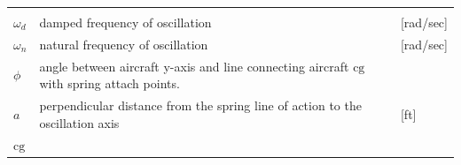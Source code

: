 \documentclass[
]{book}
\begin{document}
\begin{longtable}[]{@{}lll@{}}
\begin{minipage}[t]{0.68\columnwidth}
\end{minipage} & \begin{minipage}[t]{0.10\columnwidth}\raggedright
\strut
\end{minipage}\tabularnewline
\begin{minipage}[t]{0.14\columnwidth}\raggedright
\(\omega_d\)\strut
\end{minipage} & \begin{minipage}[t]{0.68\columnwidth}\raggedright
damped frequency of oscillation\strut
\end{minipage} & \begin{minipage}[t]{0.10\columnwidth}\raggedright
{[}rad/sec{]}\strut
\end{minipage}\tabularnewline
\begin{minipage}[t]{0.14\columnwidth}\raggedright
\(\omega_n\)\strut
\end{minipage} & \begin{minipage}[t]{0.68\columnwidth}\raggedright
natural frequency of oscillation\strut
\end{minipage} & \begin{minipage}[t]{0.10\columnwidth}\raggedright
{[}rad/sec{]}\strut
\end{minipage}\tabularnewline
\begin{minipage}[t]{0.14\columnwidth}\raggedright
\(\phi\)\strut
\end{minipage} & \begin{minipage}[t]{0.68\columnwidth}\raggedright
angle between aircraft y-axis and line connecting aircraft \(\mathrm{cg}\) with spring attach points.\strut
\end{minipage} & \begin{minipage}[t]{0.10\columnwidth}\raggedright
\strut
\end{minipage}\tabularnewline
\begin{minipage}[t]{0.14\columnwidth}\raggedright
\(a\)\strut
\end{minipage} & \begin{minipage}[t]{0.68\columnwidth}\raggedright
perpendicular distance from the spring line of action to the oscillation axis\strut
\end{minipage} & \begin{minipage}[t]{0.10\columnwidth}\raggedright
{[}ft{]}\strut
\end{minipage}\tabularnewline
\begin{minipage}[t]{0.14\columnwidth}\raggedright
\(\mathrm{cg}\)\strut
\end{minipage} & \begin{minipage}[t]{0.68\columnwidth}\raggedright

\end{minipage}
\end{longtable}
\end{document}
